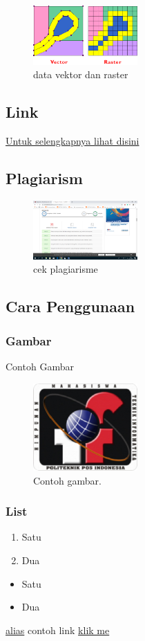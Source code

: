 \begin{figure}[H]
	\includegraphics[width=4cm]{figures/1174096/1/vektordanraster.png}
	\centering
	\caption{data vektor dan raster}
\end{figure}
\subsection{Link}
\href{https://youtu.be/94y4uCmKc1Q}{Untuk selengkapnya lihat disini}

\subsection{Plagiarism}
\begin{figure}[H]
	\includegraphics[width=4cm]{figures/1174096/1/plagiarisme.png}
	\centering
	\caption{cek plagiarisme}
\end{figure}


\subsection{Cara Penggunaan}
\subsubsection{Gambar}

\hfill\break

Contoh Gambar
\begin{figure}[H]
	\includegraphics[width=4cm]{figures/himatif.png}
	\centering
	\caption{Contoh gambar.}
\end{figure}

\subsubsection{List}
\begin{enumerate}
	\item Satu
	\item Dua
\end{enumerate}

\begin{itemize}
	\item Satu
	\item Dua
\end{itemize}

\href{link kamu}{alias}
contoh link
\href{https://www.google.com/}{klik me}